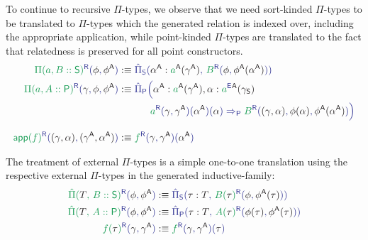 \begin{defn}
To continue to recursive $\Pi$-types, we observe that we need sort-kinded
$\Pi$-types to be translated to $\Pi$-types which the generated relation is
indexed over, including the appropriate application,
while point-kinded $\Pi$-types are translated to the fact that
relatedness is preserved for all point constructors.
\begin{align*}
\tqm{\grm{\Pi(a, B :: \Sc)}^\RR(\blphi, \blphiCC)}
  &:\equiv \tqm{\ExtPiS{\blalphaCC : \grm{a}^\CC(\blgammaCC)}
    {\grm{B}^\RR(\blphi, \blm{\blphiCC(\blalphaCC)})}} \\
\tqm{\grm{\Pi(a, A :: \Pc)}^\RR(\blgamma, \blphi, \blphiCC)}
  &:\equiv 
\tqm{\hat{\Pi}_\Pc\Bigl(\blm{\blalphaCC : \grm{a}^\CC(\blgammaCC), \blalpha : \tqm{\grm{a}^\EE}^\CC(\gamma_\Sc)}} \\
  & \phantom{:\equiv\hat{\Pi}_\Pc\Bigl(}
    \tqm{ \grm{a}^\RR(\blgamma,\blgammaCC)(\blalphaCC)(\blalpha)
\Rightarrow_\Pc \grm{B}^\RR(\blm{(\gamma, \alpha)}, \blm{\phi(\alpha)}, \blm{\blphiCC(\blalphaCC)}) \Bigr) }
\\[.7em]
\tqm{\grm{\IIapp(f)}^\RR(\blm{(\gamma, \alpha)},\blm{(\blgammaCC,\blalphaCC)})}
  &:\equiv \tqm{\grm{f}^\RR(\blgamma, \blgammaCC)(\blalphaCC) }
\end{align*}

The treatment of external $\Pi$-types is a simple one-to-one translation
using the respective external $\Pi$-types in the generated inductive-family:
\begin{align*}
\tqm{\grm{\ExtPi{T}{B :: \Sc}}^\RR(\blphi, \blphiCC)}
  &:\equiv \tqm{\ExtPiS{\tau : T}{\grm{B(\bltau)}^\RR(\blphi, \blm{\phi^\CC(\tau)})}} \\
\tqm{\grm{\ExtPi{T}{A :: \Pc}}^\RR(\blphi, \blphiCC)}
  &:\equiv \tqm{\ExtPiP{\tau : T}{\grm{A(\bltau)}^\RR(\blm{\phi(\tau)}, \blm{\phi^\CC(\tau)})}} \\
\tqm{\grm{f(\bltau)}^\RR(\blgamma, \blgammaCC)}
  &:\equiv \tqm{\grm{f}^\RR(\blgamma, \blgammaCC)(\bltau)}
\end{align*}


\end{defn}
